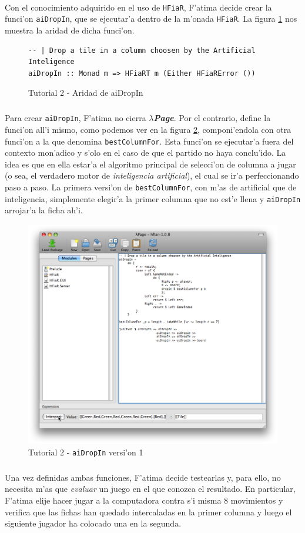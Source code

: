 \documentclass[a4paper]{article}
\newcommand{\hpage}{\textbf{\textsl{$\lambda$Page}}}
\begin{document}
\paragraph{}Con el conocimiento adquirido en el uso de \texttt{HFiaR}, F'atima decide crear la funci'on \texttt{aiDropIn}, que se ejecutar'a dentro de la m'onada \texttt{HFiaR}.  La figura \ref{tut207} nos muestra la aridad de dicha funci'on.
\begin{figure}[hp]
	\begin{center}
		\begin{lstlisting}
-- | Drop a tile in a column choosen by the Artificial Inteligence
aiDropIn :: Monad m => HFiaRT m (Either HFiaRError ())
		\end{lstlisting}
		\caption{Tutorial 2 - Aridad de aiDropIn}
		\label{tut207}
	\end{center}
\end{figure}
\subparagraph{}Para crear \texttt{aiDropIn}, F'atima no cierra \hpage.  Por el contrario, define la funci'on all'i mismo, como podemos ver en la figura \ref{tut208}, componi'endola con otra funci'on a la que denomina \texttt{bestColumnFor}.  Esta funci'on se ejecutar'a fuera del contexto mon'adico y s'olo en el caso de que el partido no haya conclu'ido.  La idea es que en ella estar'a el algoritmo principal de selecci'on de columna a jugar (o sea, el verdadero motor de \textsl{inteligencia artificial}), el cual se ir'a perfeccionando paso a paso.  La primera versi'on de \texttt{bestColumnFor}, con m'as de artificial que de inteligencia, simplemente elegir'a la primer columna que no est'e llena y \texttt{aiDropIn} arrojar'a la ficha ah'i.
\begin{figure}[hp]
	\begin{center}
        	\includegraphics[width=.75\textwidth]{pictures/tut2/06}
		\caption{Tutorial 2 - \texttt{aiDropIn} versi'on 1}
		\label{tut208}
	\end{center}
\end{figure}
\subparagraph{}Una vez definidas ambas funciones, F'atima decide testearlas y, para ello, no necesita m'as que \textsl{evaluar} un juego en el que conozca el resultado.  En particular, F'atima elije hacer jugar a la computadora contra s'i misma 8 movimientos y verifica que las fichas han quedado intercaladas en la primer columna y luego el siguiente jugador ha colocado una en la segunda.
\end{document}
